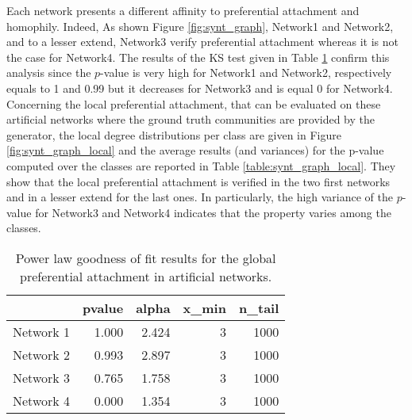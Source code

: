 \documentclass[a4paper, 12pt]{article}
\newcommand*{\lpath}{../}%
\begin{document}
Each network presents a different affinity to preferential attachment and homophily.
Indeed, As shown Figure \ref{fig:synt_graph}, Network1 and Network2, and to a lesser extend, Network3 verify preferential attachment whereas it is not the case for Network4. The results of the KS test given in Table \ref{table:synt_graph} confirm this analysis since the $p$-value is very high for Network1 and Network2, respectively equals to 1 and 0.99 but it decreases for Network3 and is equal 0 for Network4.
Concerning the local preferential attachment, that can be evaluated on these artificial networks where the ground truth communities are provided by the generator, the local degree distributions per class are given in Figure \ref{fig:synt_graph_local} and the average results (and variances) for the p-value computed over the classes are reported in Table \ref{table:synt_graph_local}. They show that the local preferential attachment is verified in the two first networks and in a lesser extend for the  last ones. In particularly, the high variance of the $p$-value for Network3 and Network4 indicates that the property varies among the classes.




\begin{table}[h]
\caption{Power law goodness of fit results for the global preferential attachment in artificial networks.}
\centering
  \begin{tabular}{lrrrr}
  	\hline
  	&   pvalue &   alpha &   x\_min &   n\_tail \\
  	\hline
  	Network 1 &    1.000 &   2.424 &       3 &     1000 \\
  	Network 2 &    0.993 &   2.897 &       3 &     1000 \\
  	Network 3 &    0.765 &   1.758 &       3 &     1000 \\
  	Network 4 &    0.000 &   1.354 &       3 &     1000 \\
  	\hline
  \end{tabular}
\label{table:synt_graph}
\end{table}
\end{document}

